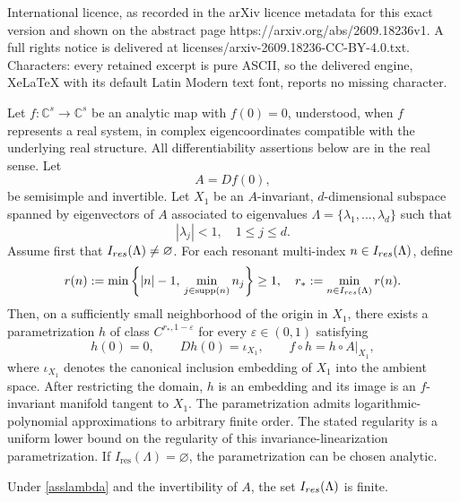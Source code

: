 \documentclass[10pt,a4paper]{amsart}
\begin{document}
International licence, as recorded in the arXiv licence metadata for this exact version and shown on the abstract page https://arxiv.org/abs/2609.18236v1. A full rights notice is delivered at licenses/arxiv-2609.18236-CC-BY-4.0.txt. Characters: every retained excerpt is pure ASCII, so the delivered engine, XeLaTeX with its default Latin Modern text font, reports no missing character.
\begin{theorem}\label{mainthm}
Let $f:\mathbb{C}^s \to\mathbb{C}^s$ be an analytic map with $f(0)=0$, understood, when $f$ represents a real system, in complex eigencoordinates compatible with the underlying real structure. All differentiability assertions below are in the real sense. Let
\begin{equation}
A=Df(0),
\end{equation}
be semisimple and invertible.
Let $X_1$ be an $A$-invariant, $d$-dimensional subspace spanned by eigenvectors of $A$ associated to eigenvalues $\Lambda = \{\lambda_1,...,\lambda_d\}$ such that
\begin{equation}\label{asslambda}
|\lambda_j|< 1,\quad 1\leq j\leq d.
\end{equation}
Assume first that $I_{\rm res}(\Lambda)\neq\varnothing$. For each resonant multi-index $n\in I_{\rm res}(\Lambda)$, define
\begin{equation}\label{def_r_star}
    r(n):=
\min\left\{
|n|-1,\,
\min_{j\in\operatorname{supp}(n)} n_j
\right\} \geq 1,\quad r_*:=
\min_{n\in I_{\rm res}(\Lambda)} r(n).
\end{equation}
Then, on a sufficiently small neighborhood of the origin in $X_1$, there exists a parametrization $h$ of class $C^{r_*,1-\varepsilon}$ for every $\varepsilon\in(0,1)$ satisfying
\begin{equation}
        h(0)=0,\qquad Dh(0)=\iota_{X_1},\qquad f\circ h=h\circ A|_{X_1},
\end{equation}
where $\iota_{X_1}$ denotes the canonical inclusion embedding of $X_1$ into the ambient space. After restricting the domain, $h$ is an embedding and its image is an $f$-invariant manifold tangent to $X_1$. The parametrization admits logarithmic-polynomial approximations to arbitrary finite order. The stated regularity is a uniform lower bound on the regularity of this invariance-linearization parametrization. If $I_{\mathrm{res}}(\Lambda)=\varnothing$, the parametrization can be chosen analytic.
\end{theorem}

\begin{lemma}\label{lemma_finite_resonances}
Under \eqref{asslambda} and the invertibility of $A$, the set $I_{\rm res}(\Lambda)$ is finite.
\end{lemma}
\end{document}
